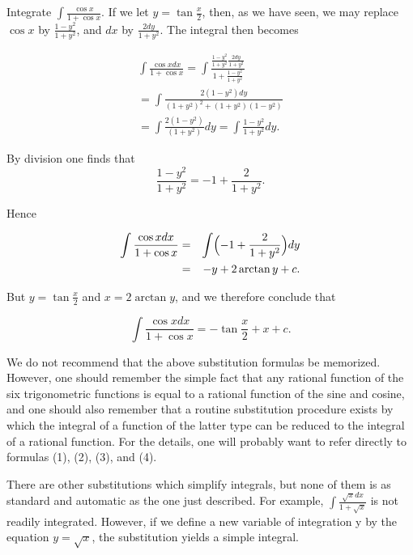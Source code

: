 \begin{example}
Integrate $\int \frac{\cos x}{1 + \cos x}$. If we let $y = \tan \frac{x}{2}$, then, as we have seen, we may replace $\cos x$ by $\frac{1 - y^2}{1 + y^2}$, and $dx$ by $\frac{2 dy}{1 + y^2}$. The integral then becomes

\begin{eqnarray*}
\int \frac{\cos x dx}{1 + \cos x} = \int \frac{\frac{1 - y^2}{1 + y^2} 
\frac{2dy}{1 + y^2}}{ 1 + \frac{1 - y^2}{1 + y^2}}\\
= \int \frac{2(1 - y^2) dy}{(1 + y^2)^2 + (1 + y^2)(1 - y^2)}\\
= \int \frac{2 (1 - y^2)}{(1 + y^2)}dy = \int \frac{1 - y^2}{1 +y^2}dy.
\end{eqnarray*}

\noindent By division one finds that 
$$
\frac{1 - y^2}{1 + y^2} = -1 + \frac{2}{1 + y^2} .
$$

\noindent Hence

\begin{eqnarray*}
\int \frac{\cos x dx}{1 + \cos x} &=& \int \Bigl( -1 + \frac{2}{1 + y^2} \Bigr) dy\\
&=& -y + 2 \arctan y + c.
\end{eqnarray*}

\noindent But $y = \tan \frac{x}{2}$ and $x = 2 \arctan y$, and we therefore conclude that

$$
\int \frac{\cos x dx}{1 + \cos x}  = - \tan \frac{x}{2}  + x + c.
$$
\end{example}

We do not recommend that the above substitution formulas be memorized. However, one should remember the simple fact that any rational function of the six trigonometric functions is equal to a rational function of the sine and cosine, and one should also remember that a routine substitution procedure exists by which the integral of a function of the latter type can be reduced to the integral of a rational function. For the details, one will probably want to refer directly to formulas (1), (2), (3), and (4).

There are other substitutions which simplify integrals, but none of them is as standard and automatic as the one just described. For example, $\int \frac {\sqrt x dx}{1 + \sqrt x}$ is not readily integrated. However, if we define a new variable of integration y by the equation $y = \sqrt x$, the substitution yields a simple integral.

